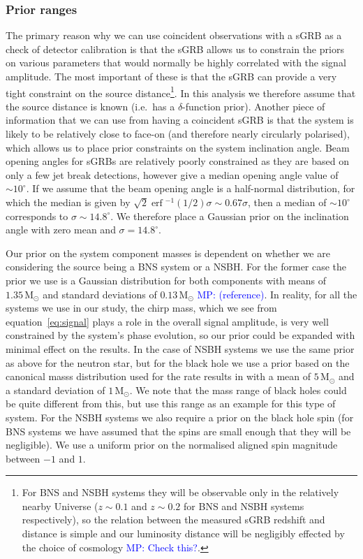 \documentclass[10pt]{iopart}
\newcommand{\MP}[1]{\textcolor{blue}{MP: #1}}
\DeclareMathOperator{\erf}{erf}
\begin{document}
\subsubsection{Prior ranges}\label{sec:priors}

The primary reason why we can use coincident observations with a \ac{sGRB} as a check of detector 
calibration is that the \ac{sGRB} allows us to constrain the priors on various parameters that 
would normally be highly correlated with the signal amplitude. The most important of these is 
that the \ac{sGRB} can provide a very tight constraint on the source distance\footnote{For \ac{BNS} 
and \ac{NSBH} systems they will be observable only in the relatively nearby Universe ($z \sim 
0.1$ and $z\sim 0.2$ for \ac{BNS} and \ac{NSBH} systems respectively), so the relation between the 
measured \ac{sGRB} redshift and distance is simple and our luminosity distance will be negligibly 
effected by the choice of cosmology \MP{Check this?}.}. In this analysis we therefore assume that 
the source distance is known (i.e.\ has a $\delta$-function prior). Another piece of information 
that we can use from having a coincident \ac{sGRB} is that the system is likely to be relatively 
close to face-on (and therefore nearly circularly polarised), which allows us to place prior 
constraints on the system inclination angle. Beam opening angles for \acp{sGRB} are relatively 
poorly constrained as they are based on only a few jet break detections, however 
\cite{2014ApJ...780..118F} give a median opening angle value of $\sim 10^{\circ}$. If we assume 
that the beam opening angle is a half-normal distribution, for which the median is given by 
$\sqrt{2}\erf{}^{-1}(1/2)\sigma \sim 0.67\sigma$, then a median of $\sim 10^{\circ}$ corresponds to 
$\sigma \sim 14.8^{\circ}$. We therefore place a Gaussian prior on the inclination angle with zero 
mean and $\sigma=14.8^{\circ}$.

Our prior on the system component masses is dependent on whether we are considering the source 
being a \ac{BNS} system or a \ac{NSBH}. For the former case the prior we use is a Gaussian 
distribution for both components with means of $1.35\,\textrm{M}_{\odot}$ and standard deviations 
of $0.13\,\textrm{M}_{\odot}$ \MP{(reference)}. In reality, for all the systems we use in our 
study, the chirp mass, which we see from equation~\ref{eq:signal} plays a role in the overall 
signal amplitude, is very well constrained by the system's phase evolution, so our prior could be 
expanded with minimal effect on the results. In the case of \ac{NSBH} systems we use the same 
prior as above for the neutron star, but for the black hole we use a prior based on the 
canonical masss distribution used for the rate results in \cite{2012PhRvD..85h2002A} with a mean of 
$5\,\textrm{M}_{\odot}$ and a standard deviation of $1\,\textrm{M}_{\odot}$. We note that the mass 
range of black holes could be quite different from this, but use this range as an example for this 
type of system. For the \ac{NSBH} systems we also require a prior on the black hole spin (for 
\ac{BNS} systems we have assumed that the spins are small enough that they will be negligible). We 
use a uniform prior on the normalised aligned spin magnitude between $-1$ and $1$.
\end{document}

